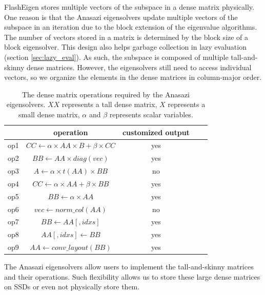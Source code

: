 FlashEigen stores multiple vectors of the subspace in a dense matrix physically.
One reason is that the Anasazi eigensolvers update multiple vectors of the subspace
in an iteration due to the block extension of the eigenvalue algorithms.
The number of vectors stored in a matrix is determined by the block size of
a block eigensolver.
This design also helps garbage collection in lazy evaluation (section \ref{sec:lazy_eval}).
As such, the subspace is composed of multiple tall-and-skinny dense matrices.
However, the eigensolvers still need to access individual vectors,
so we organize the elements in the dense matrices in column-major order. 

\begin{table}
	\begin{center}
		\small
		\begin{tabular}{|c|c|c|c|c|}
			\hline
			& operation & customized output \\
			\hline
			op1 & $CC \leftarrow \alpha \times AA \times B + \beta \times CC$ & yes \\
			\hline
			op2 & $BB \leftarrow AA \times diag(vec)$ & yes \\
			\hline
			op3 & $A \leftarrow \alpha \times t(AA) \times BB$ & no \\
			\hline
			op4 & $CC \leftarrow \alpha \times AA + \beta \times BB$ & yes \\
			\hline
			op5 & $BB \leftarrow \alpha \times AA$ & yes \\
			\hline
			op6 & $vec \leftarrow norm\_col(AA)$ & no \\
			\hline
			op7 & $BB \leftarrow AA[,idxs]$ & yes \\
			\hline
			op8 & $AA[,idxs] \leftarrow BB$ & yes \\
			\hline
			op9 & $AA \leftarrow conv\_layout(BB)$ & yes \\
			\hline
		\end{tabular}
		\normalsize
	\end{center}
	\caption{The dense matrix operations required by the Anasazi eigensolvers.
		$XX$ represents a tall dense matrix, $X$ represents a small dense matrix,
	$\alpha$ and $\beta$ represents scalar variables.}
	\label{anasazi_ops}
\end{table}

The Anasazi eigensolvers allow users to implement
the tall-and-skinny matrices and their operations. Such flexibility allows us to
store these large dense matrices on SSDs or even not physically store them.

